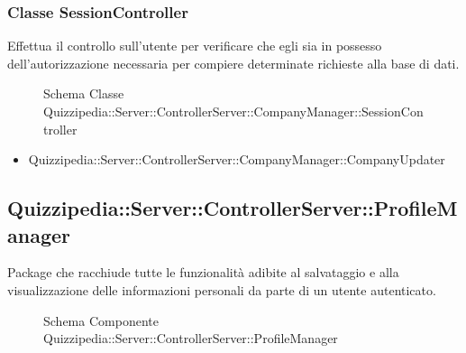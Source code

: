 \subsubsection{Classe SessionController}
Effettua il controllo sull'utente per verificare che egli sia in possesso dell'autorizzazione necessaria per compiere determinate richieste alla base di dati.
\begin{figure}[H]
\centering
\noindent{}
\caption{Schema Classe Quizzipedia::Server::ControllerServer::CompanyManager::SessionController}
\end{figure}
\begin{itemize}
\item Quizzipedia::Server::ControllerServer::CompanyManager::CompanyUpdater
\end{itemize}
\subsection{Quizzipedia::Server::ControllerServer::ProfileManager}
Package che racchiude tutte le funzionalità adibite al salvataggio e alla visualizzazione delle informazioni personali da parte di un utente autenticato.
\begin{figure}[H]
\centering
\noindent{}
\caption[Quizzipedia::Server::ControllerServer::ProfileManager]{Schema Componente Quizzipedia::Server::ControllerServer::ProfileManager}
\end{figure}
